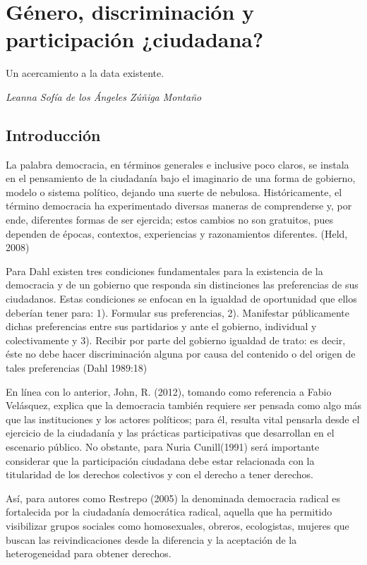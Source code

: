 \documentclass[
]{book}
\theoremstyle{definition}
\theoremstyle{definition}
\theoremstyle{definition}
\theoremstyle{definition}
\theoremstyle{remark}
\begin{document}
\hypertarget{guxe9nero-discriminaciuxf3n-y-participaciuxf3n-ciudadana}{%
\chapter{Género, discriminación y participación ¿ciudadana?}\label{guxe9nero-discriminaciuxf3n-y-participaciuxf3n-ciudadana}}

Un acercamiento a la data existente.

\emph{Leanna Sofía de los Ángeles Zúñiga Montaño}

\hypertarget{introducciuxf3n}{%
\section{Introducción}\label{introducciuxf3n}}

La palabra democracia, en términos generales e inclusive poco claros, se instala en el pensamiento de la ciudadanía bajo el imaginario de una forma de gobierno, modelo o sistema político, dejando una suerte de nebulosa. Históricamente, el término democracia ha experimentado diversas maneras de comprenderse y, por ende, diferentes formas de ser ejercida; estos cambios no son gratuitos, pues dependen de épocas, contextos, experiencias y razonamientos diferentes. (Held, 2008)

Para Dahl existen tres condiciones fundamentales para la existencia de la democracia y de un gobierno que responda sin distinciones las preferencias de sus ciudadanos. Estas condiciones se enfocan en la igualdad de oportunidad que ellos deberían tener para: 1). Formular sus preferencias, 2). Manifestar públicamente dichas preferencias entre sus partidarios y ante el gobierno, individual y colectivamente y 3). Recibir por parte del gobierno igualdad de trato: es decir, éste no debe hacer discriminación alguna por causa del contenido o del origen de tales preferencias (Dahl 1989:18)

En línea con lo anterior, John, R. (2012), tomando como referencia a Fabio Velásquez, explica que la democracia también requiere ser pensada como algo más que las instituciones y los actores políticos; para él, resulta vital pensarla desde el ejercicio de la ciudadanía y las prácticas participativas que desarrollan en el escenario público. No obstante, para Nuria Cunill(1991) será importante considerar que la participación ciudadana debe estar relacionada con la titularidad de los derechos colectivos y con el derecho a tener derechos.

Así, para autores como Restrepo (2005) la denominada democracia radical es fortalecida por la ciudadanía democrática radical, aquella que ha permitido visibilizar grupos sociales como homosexuales, obreros, ecologistas, mujeres que buscan las reivindicaciones desde la diferencia y la aceptación de la heterogeneidad para obtener derechos.
\end{document}
